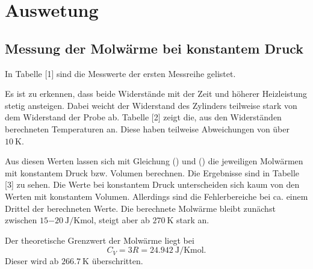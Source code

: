 \section{Auswetung}
\subsection{Messung der Molwärme bei konstantem Druck}
In Tabelle [1] sind die Messwerte der ersten Messreihe gelistet.

Es ist zu erkennen, dass beide Widerstände mit der Zeit und höherer Heizleistung
stetig ansteigen. Dabei weicht der Widerstand des Zylinders teilweise stark von dem
Widerstand der Probe ab.
Tabelle [2] zeigt die, aus den Widerständen berechneten Temperaturen an. Diese haben teilweise
Abweichungen von über $\SI{10}{\kelvin}$.

Aus diesen Werten lassen sich mit Gleichung () und () die jeweiligen Molwärmen mit
konstantem Druck bzw. Volumen berechnen. Die Ergebnisse sind in Tabelle [3] zu sehen.
Die Werte bei konstantem Druck unterscheiden sich kaum von den Werten mit konstantem Volumen.
Allerdings sind die Fehlerbereiche bei ca. einem Drittel der berechneten Werte.
Die berechnete Molwärme bleibt zunächst zwischen $\SI{15-20}{\joule\per\kelvin\mol}$, steigt aber
ab $\SI{270}{\kelvin}$ stark an.

Der theoretische Grenzwert der Molwärme liegt bei
\begin{equation}
  C_V = 3R = \SI{24,942}{\joule\per\kelvin\mol}.
\end{equation}
Dieser wird ab $\SI{266,7}{\kelvin}$ überschritten.
